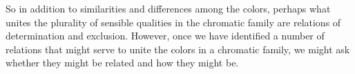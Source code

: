 \documentclass[12pt]{article}
\begin{document}
So in addition to similarities and differences among the colors, perhaps what unites the plurality of sensible qualities in the chromatic family are relations of determination and exclusion. However, once we have identified a number of relations that might serve to unite the colors in a chromatic family, we might ask whether they might be related and how they might be. 

 
 
\end{document}
